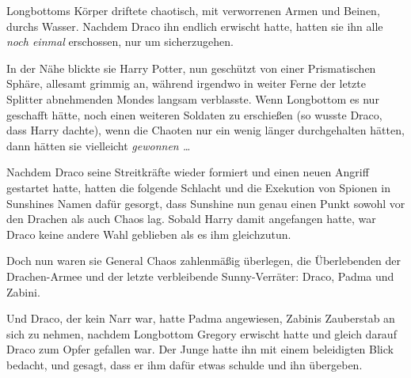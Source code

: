 Longbottoms Körper driftete chaotisch, mit verworrenen Armen und Beinen, durchs Wasser. Nachdem Draco ihn endlich erwischt hatte, hatten sie ihn alle \emph{noch einmal} erschossen, nur um sicherzugehen.

In der Nähe blickte sie Harry Potter, nun geschützt von einer Prismatischen Sphäre, allesamt grimmig an, während irgendwo in weiter Ferne der letzte Splitter abnehmenden Mondes langsam verblasste. Wenn Longbottom es nur geschafft hätte, noch einen weiteren Soldaten zu erschießen (so wusste Draco, dass Harry dachte), wenn die Chaoten nur ein wenig länger durchgehalten hätten, dann hätten sie vielleicht \emph{gewonnen …}

Nachdem Draco seine Streitkräfte wieder formiert und einen neuen Angriff gestartet hatte, hatten die folgende Schlacht und die Exekution von Spionen in Sunshines Namen dafür gesorgt, dass Sunshine nun genau einen Punkt sowohl vor den Drachen als auch Chaos lag. Sobald Harry damit angefangen hatte, war Draco keine andere Wahl geblieben als es ihm gleichzutun.

Doch nun waren sie General Chaos zahlenmäßig überlegen, die Überlebenden der Drachen-Armee und der letzte verbleibende Sunny-Verräter: Draco, Padma und Zabini.

Und Draco, der kein Narr war, hatte Padma angewiesen, Zabinis Zauberstab an sich zu nehmen, nachdem Longbottom Gregory erwischt hatte und gleich darauf Draco zum Opfer gefallen war. Der Junge hatte ihn mit einem beleidigten Blick bedacht, und gesagt, dass er ihm dafür etwas schulde und ihn übergeben.

